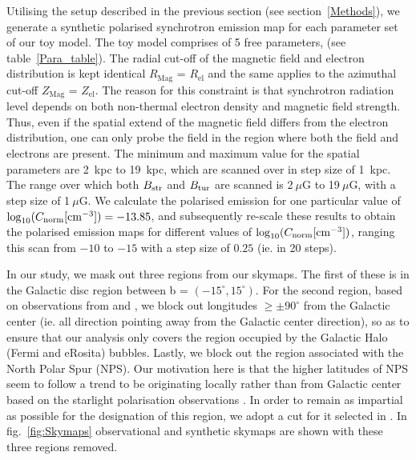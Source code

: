 \documentclass[12pt, a4 paper]{article}
\newcommand{\Andrew}[1]{\textcolor{dg}{#1}}
\newcommand{\Vasu}[1]{{\color{purple}#1}}
\begin{document}
Utilising the setup described in the previous section (see section~\ref{Methods}), we generate a synthetic polarised synchrotron emission map for each parameter set of our toy model. The toy model comprises of 5 free parameters, (see table~\ref{Para_table}). The radial cut-off of the magnetic field and electron distribution is kept identical $R_{\mathrm{Mag}}$ = $R_{\mathrm{el}}$ and the same applies to the azimuthal cut-off $Z_{\mathrm{Mag}}$ = $Z_{\mathrm{el}}$. The reason for this constraint is that synchrotron radiation level depends on both non-thermal electron density and magnetic field strength. Thus, even if the spatial extend of the magnetic field differs from the electron distribution, one can only probe the field in the region where both the field and electrons are present. The minimum and maximum value for the spatial parameters are 2~kpc to 19~kpc, which are scanned over in step size of 1~kpc. 
The range over which both $B_{\rm str}$ and $B_{\rm tur}$ are scanned is 2$~\mu$G to 19$~\mu$G, with a step size of 1$~\mu$G. We calculate the polarised emission for one particular value of $\log_{10}(C_{\rm norm}[{\rm cm}^{-3}]) = -13.85$, and subsequently re-scale these results to obtain the polarised emission maps for different values of  $\log_{10}(C_{\rm norm} [{\rm cm}^{-3}])$, ranging this scan from $-10$ to $-15$ with a step size of $0.25$ (ie. in 20 steps).



In our study, we mask out three regions from our skymaps. The first of these is in the Galactic disc region between b = $(-15^{\circ},15^{\circ})$. For the second region, based on observations from \cite{eROSITA} and \cite{Su_2010}, we block out longitudes  $\geq \pm 90^{\circ}$ from the Galactic center (ie. all direction pointing away from the Galactic center direction), so as to ensure that our analysis only covers the region occupied by the Galactic Halo (Fermi and eRosita) bubbles. Lastly, we block out the region associated with the North Polar Spur (NPS). Our motivation here is that the higher latitudes of NPS seem to follow a trend to be originating locally rather than from Galactic center based on the starlight polarisation observations \cite{Gina_2021}. In order to remain as impartial as possible for the designation of this region, we adopt a cut for it selected in \cite{Wolleben_2007}. In fig.~\ref{fig:Skymaps} observational and synthetic skymaps are shown with these three regions removed.
\end{document}
